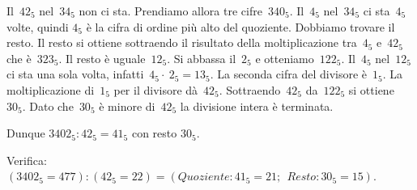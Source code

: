 \begin{exrig}
Il~$42_5$ nel~$34_5$ non ci sta. Prendiamo allora tre cifre~$340_5$. Il~$4_5$
nel~$34_5$ ci sta~$4_5$ volte, quindi $4_5$ è la cifra di ordine più alto
del quoziente. Dobbiamo trovare il resto. Il resto si ottiene
sottraendo il risultato della moltiplicazione tra~$4_5$ e~$42_5$ che è~$323_5$.
Il resto è uguale~$12_5$.
Si abbassa il~$2_5$ e otteniamo~$122_5$. Il~$4_5$ nel~$12_5$ ci
sta una sola volta, infatti~$4_5\cdot~2_5=13_5$. La seconda cifra del
divisore è~$1_5$.
La moltiplicazione di~$1_5$ per il divisore dà~$42_5$. Sottraendo~$42_5$
da~$122_5$ si ottiene~$30_5$. Dato che~$30_5$ è minore di~$42_5$ la
divisione intera è terminata.

Dunque $3402_{5}:42_{5} = 41_{5}$ con resto $30_{5}$.

Verifica:~$(3402_{5}=477):(42_{5}=22)=(\mathit{Quoziente}:41_{5}=21;\:\:\mathit{Resto}:30_{5}=15)$.
\vspace*{1.5ex}

\end{exrig}

\ovalbox{\risolvii \ref{ese:4.30}, \ref{ese:4.31}}
\newpage

\cleardoublepage

